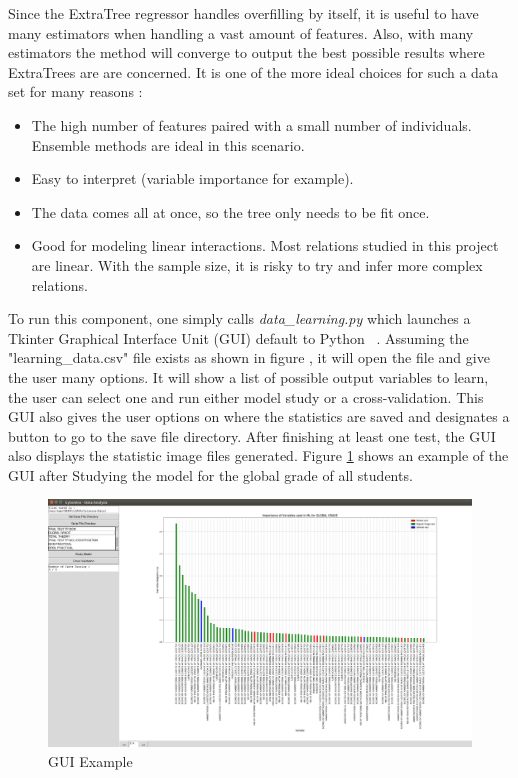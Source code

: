 \documentclass[a4paper,11pt]{report}
\numberwithin{figure}{chapter} %
\begin{document}
    Since the ExtraTree regressor handles overfilling by itself, it is useful to have many estimators when handling a vast amount of features.
    Also, with many estimators the method will converge to output the best possible results where ExtraTrees are are concerned.
    It is one of the more ideal choices for such a data set for many reasons :
    \begin{itemize}
        \item[\textbullet] The high number of features paired with a small number of individuals.
        Ensemble methods are ideal in this scenario.
        \item[\textbullet] Easy to interpret (variable importance for example).
        \item[\textbullet] The data comes all at once, so the tree only needs to be fit once.
        \item[\textbullet] Good for modeling linear interactions.
        Most relations studied in this project are linear.
        With the sample size, it is risky to try and infer more complex relations.
    \end{itemize}

    To run this component, one simply calls \textit{data\_learning.py} which launches a Tkinter Graphical Interface Unit (GUI) default to Python ~\cite{pyth}.
    Assuming the "learning\_data.csv" file exists as shown in figure \label{fig:struct}, it will open the file and give the user many options.
    It will show a list of possible output variables to learn, the user can select one and run either model study or a cross-validation.
    This GUI also gives the user options on where the statistics are saved and designates a button to go to the save file directory.
    After finishing at least one test, the GUI also displays the statistic image files generated.
    Figure \ref{fig:gui} shows an example of the GUI after Studying the model for the global grade of all students.

    \begin{figure}[H]
      \centering
      \includegraphics[width=.9\linewidth]{images/gui.png}
      \caption{GUI Example}
      \label{fig:gui}
    \end{figure}
\end{document}
